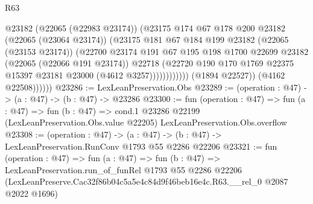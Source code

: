 \begin{lexlean}{R63}
\begin{coremodule}
                              @23182
                              (@22065 (@22983 @23174))
                              (@23175
                                @174
                                @67
                                @178
                                @200
                                @23182
                                (@22065 (@23064 @23174))
                                (@23175
                                  @181
                                  @67
                                  @184
                                  @199
                                  @23182
                                  (@22065 (@23153 @23174))
                                  (@22700
                                    @23174
                                    @191
                                    @67
                                    @195
                                    @198
                                    @1700
                                    @22699
                                    @23182
                                    (@22065 (@22066 @191 @23174))
                                    @22718
                                    (@22720
                                      @190
                                      @170
                                      @1769
                                      @22375
                                      @15397
                                      @23181
                                      @23000
                                      (@4612 @3257))))))))))))
                (@1894 @22527))
              (@4162 @22508))))))
@23286 := LexLeanPreservation.Obs
@23289 := (operation : @47) -> (a : @47) -> (b : @47) -> @23286
@23300 := fun (operation : @47) =>
  fun (a : @47) =>
  fun (b : @47) =>
  cond.{1} @23286 @22199 (LexLeanPreservation.Obs.value @22205) LexLeanPreservation.Obs.overflow
@23308 := (operation : @47) ->
  (a : @47) -> (b : @47) -> LexLeanPreservation.RunConv @1793 @55 @2286 @22206
@23321 := fun (operation : @47) =>
  fun (a : @47) =>
  fun (b : @47) =>
  LexLeanPreservation.run_of_funRel
    @1793
    @55
    @2286
    @22206
    (LexLeanPreserve.Cac32f86b04c5a5e4c84d9f46beb16e4c.R63.__rel_0 @2087 @2022 @1696)
\end{coremodule}
\end{lexlean}
